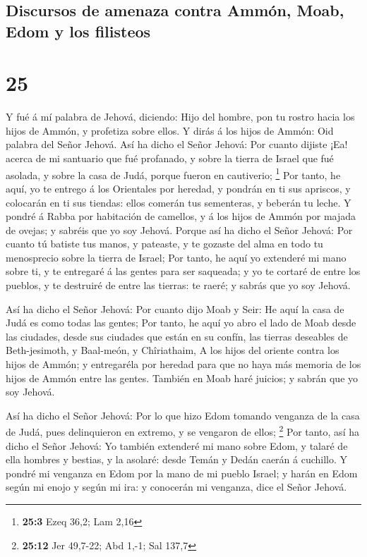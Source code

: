 \hypertarget{discursos-de-amenaza-contra-ammuxf3n-moab-edom-y-los-filisteos}{%
\subsection{Discursos de amenaza contra Ammón, Moab, Edom y los
filisteos}\label{discursos-de-amenaza-contra-ammuxf3n-moab-edom-y-los-filisteos}}

\hypertarget{section-24}{%
\section{25}\label{section-24}}

 Y fué á mí palabra de Jehová, diciendo: 
Hijo del hombre, pon tu rostro hacia los hijos de Ammón, y profetiza
sobre ellos.  Y dirás á los hijos de Ammón: Oid palabra
del Señor Jehová. Así ha dicho el Señor Jehová: Por cuanto dijiste ¡Ea!
acerca de mi santuario que fué profanado, y sobre la tierra de Israel
que fué asolada, y sobre la casa de Judá, porque fueron en cautiverio;
\footnote{\textbf{25:3} Ezeq 36,2; Lam 2,16}  Por tanto,
he aquí, yo te entrego á los Orientales por heredad, y pondrán en ti sus
apriscos, y colocarán en ti sus tiendas: ellos comerán tus sementeras, y
beberán tu leche.  Y pondré á Rabba por habitación de
camellos, y á los hijos de Ammón por majada de ovejas; y sabréis que yo
soy Jehová.  Porque así ha dicho el Señor Jehová: Por
cuanto tú batiste tus manos, y pateaste, y te gozaste del alma en todo
tu menosprecio sobre la tierra de Israel;  Por tanto, he
aquí yo extenderé mi mano sobre ti, y te entregaré á las gentes para ser
saqueada; y yo te cortaré de entre los pueblos, y te destruiré de entre
las tierras: te raeré; y sabrás que yo soy Jehová.

 Así ha dicho el Señor Jehová: Por cuanto dijo Moab y
Seir: He aquí la casa de Judá es como todas las gentes; 
Por tanto, he aquí yo abro el lado de Moab desde las ciudades, desde sus
ciudades que están en su confín, las tierras deseables de Beth-jesimoth,
y Baal-meón, y Chîriathaim,  A los hijos del oriente
contra los hijos de Ammón; y entregaréla por heredad para que no haya
más memoria de los hijos de Ammón entre las gentes. 
También en Moab haré juicios; y sabrán que yo soy Jehová.

 Así ha dicho el Señor Jehová: Por lo que hizo Edom
tomando venganza de la casa de Judá, pues delinquieron en extremo, y se
vengaron de ellos; \footnote{\textbf{25:12} Jer 49,7-22; Abd 1,-1; Sal
  137,7}  Por tanto, así ha dicho el Señor Jehová: Yo
también extenderé mi mano sobre Edom, y talaré de ella hombres y
bestias, y la asolaré: desde Temán y Dedán caerán á cuchillo.
 Y pondré mi venganza en Edom por la mano de mi pueblo
Israel; y harán en Edom según mi enojo y según mi ira: y conocerán mi
venganza, dice el Señor Jehová.

